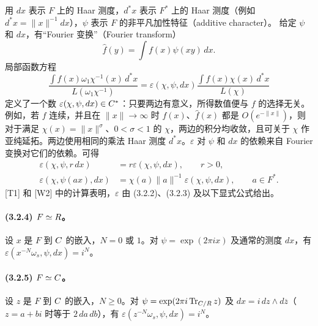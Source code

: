 用 $dx$ 表示 $F$ 上的 Haar 测度，$d^*x$ 表示 $F^*$ 上的 Haar 测度（例如 $d^*x=\lVert x\rVert^{-1}dx$），$\psi$ 表示 $F$ 的非平凡加性特征（additive character）。
给定 $\psi$ 和 $dx$，有“Fourier 变换”（Fourier transform）
\[
 \widehat f(y)=\int f(x)\psi(xy)\,dx.
\]
局部函数方程
\begin{equation}
 \frac{\int\widehat f(x)\omega_1\chi^{-1}(x)\,d^*x}{L(\omega_1\chi^{-1})}
 =\varepsilon(\chi,\psi,dx)\frac{\int f(x)\chi(x)\,d^*x}{L(\chi)}\tag{3.2.1}
\end{equation}
定义了一个数 $\varepsilon(\chi,\psi,dx)\in C^*$：只要两边有意义，所得数值便与 $f$ 的选择无关。例如，若 $f$ 连续，并且在 $\lVert x\rVert\to\infty$ 时 $f(x)$、$\widehat f(x)$ 都是 $O(e^{-\lVert x\rVert})$，则对于满足 $\chi(x)=\lVert x\rVert^\sigma$、$0<\sigma<1$ 的 $\chi$，两边的积分均收敛，且可关于 $\chi$ 作亚纯延拓。两边使用相同的乘法 Haar 测度 $d^*x$。$\varepsilon$ 对 $\psi$ 和 $dx$ 的依赖来自 Fourier 变换对它们的依赖。可得
\begin{align}
 \varepsilon(\chi,\psi,r\,dx)&=r\varepsilon(\chi,\psi,dx),\qquad r>0,\tag{3.2.2}\\
 \varepsilon(\chi,\psi(ax),dx)&=\chi(a)\lVert a\rVert^{-1}\varepsilon(\chi,\psi,dx),\qquad a\in F^*.\tag{3.2.3}
\end{align}
[T1] 和 [W2] 中的计算表明，$\varepsilon$ 由 (3.2.2)、(3.2.3) 及以下显式公式给出。

\paragraph*{(3.2.4) $F\simeq R$。}
设 $x$ 是 $F$ 到 $C$ 的嵌入，$N=0$ 或 $1$。对 $\psi=\exp(2\pi ix)$ 及通常的测度 $dx$，有 $\varepsilon(x^{-N}\omega_s,\psi,dx)=i^N$。

\paragraph*{(3.2.5) $F\simeq C$。}
设 $z$ 是 $F$ 到 $C$ 的嵌入，$N\geq0$。对 $\psi=\exp(2\pi i\operatorname{Tr}_{C/R}z)$ 及 $dx=i\,dz\wedge d\overline z$（$z=a+bi$ 时等于 $2\,da\,db$），有 $\varepsilon(z^{-N}\omega_s,\psi,dx)=i^N$。

